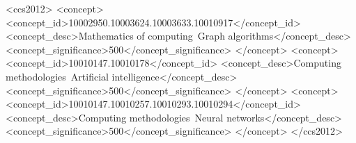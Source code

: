 \documentclass[sigconf]{acmart}
\begin{document}
\begin{CCSXML}
<ccs2012>
<concept>
<concept_id>10002950.10003624.10003633.10010917</concept_id>
<concept_desc>Mathematics of computing~Graph algorithms</concept_desc>
<concept_significance>500</concept_significance>
</concept>
<concept>
<concept_id>10010147.10010178</concept_id>
<concept_desc>Computing methodologies~Artificial intelligence</concept_desc>
<concept_significance>500</concept_significance>
</concept>
<concept>
<concept_id>10010147.10010257.10010293.10010294</concept_id>
<concept_desc>Computing methodologies~Neural networks</concept_desc>
<concept_significance>500</concept_significance>
</concept>
</ccs2012>
\end{CCSXML}







\maketitle
\end{document}
